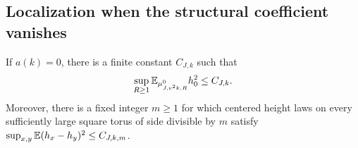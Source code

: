 \subsection{Localization when the structural coefficient vanishes}

\begin{proposition}\label{st:zero-localization}
If $a(k)=0$, there is a finite constant $C_{J,k}$ such that
\begin{equation}\label{st:localized-criterion}
 \sup_{R\ge1}\mathbb E_{\mu^0_{J,v^2k,R}}h_0^2\le C_{J,k}.
\end{equation}
Moreover, there is a fixed integer $m\ge1$ for which centered height
laws on every sufficiently large square torus of side divisible by $m$
satisfy $\sup_{x,y}\mathbb E(h_x-h_y)^2\le C_{J,k,m}$.
\end{proposition}

